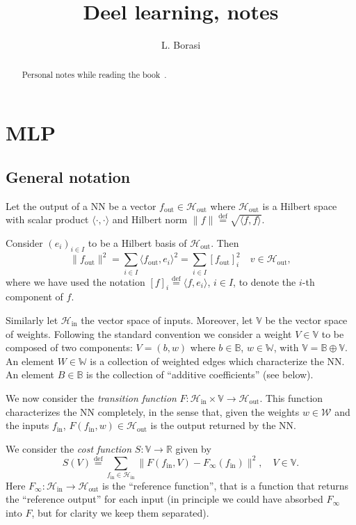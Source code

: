 \documentclass[10pt, a4paper]{article}
\title{Deel learning, notes}
\author{L. Borasi}
\theoremstyle{plain}
\theoremstyle{definition}
\theoremstyle{definition}
\theoremstyle{definition}
\theoremstyle{definition}
\theoremstyle{definition}
\theoremstyle{definition}
\theoremstyle{definition}
\theoremstyle{remark}
\theoremstyle{remark}
\theoremstyle{rudin-style-generic}
\theoremstyle{rudin-style-generic*}
\theoremstyle{rudin-style-theorem}
\newcommand{\deq}{\stackrel{\mathrm{def}}{=}}
\newcommand{\RR}{\mathbb R}
\begin{document}
\maketitle
\begin{abstract}
	Personal notes while reading the book~\cite{goodfellowDeepLearning2016}.
\end{abstract}
\tableofcontents


\section{MLP}
\subsection{General notation}\label{sec:general-notation}
Let the output of a NN be a vector $f_{\text{out}}\in \mathcal H_{\text{out}}$ 
where $\mathcal H_{\text{out}}$ is a Hilbert space with scalar product $\langle\cdot,\cdot\rangle$
and Hilbert norm $\|f\|\deq \sqrt{\langle f,f\rangle}$.
 
Consider $(e_i)_{i\in I}$ to be a Hilbert basis of $\mathcal H_{\text{out}}$.
Then
\begin{equation*}
	\| f_{\text{out}} \|^2 = \sum_{i\in I} \langle f_{\text{out}}, e_i \rangle^2 = \sum_{i\in I}  [f_{\text{out}}]_i^2 
	\quad v\in\mathcal H_{\text{out}}
	,
\end{equation*}
where we have used the notation $[f]_i \deq \langle f, e_i\rangle$, $i\in I$, to denote the $i$-th component of $f$.

Similarly let $\mathcal H_{\text{in}}$ the vector space of inputs.
Moreover, let $\mathbb V$ be the vector space of weights.
Following the standard convention we consider a weight $V\in\mathbb V$ to be composed of two components:
$V = (b,w)$ where $b\in \mathbb B$, $w\in\mathbb W$, with $\mathbb V=\mathbb B\oplus\mathbb V$.
An element $W\in\mathbb W$ is a collection of weighted edges which characterize the NN.
An element $B\in\mathbb B$ is the collection of ``additive coefficients'' (see below).

We now consider the \textit{transition function}  $F:\mathcal H_{\text{in}} \times \mathbb V \rightarrow \mathcal H_{\text{out}}$.
This function characterizes the NN completely, in the sense that, given the weights $w\in\mathcal W$ and the inputs $f_{\text{in}}$,
$F(f_{\text{in}}, w)\in\mathcal H_{\text{out}}$ is the output returned by the NN.

We consider the \textit{cost function} $S:\mathbb V\rightarrow \RR$ given by
\begin{equation*}
	S(V) \deq \sum_{f_{\text{in}}\in\mathcal H_{\text{in}}} \| F(f_{\text{in}}, V) - F_\infty(f_{\text{in}}) \|^2,
	\quad V\in\mathbb V
	.
\end{equation*}
Here $F_\infty:\mathcal H_{\text{in}}\rightarrow\mathcal H_{\text{out}}$ is the ``reference function'',
that is a function that returns the ``reference output'' for each input (in principle we could have absorbed $F_\infty$ into $F$,
but for clarity we keep them separated).
\end{document}
